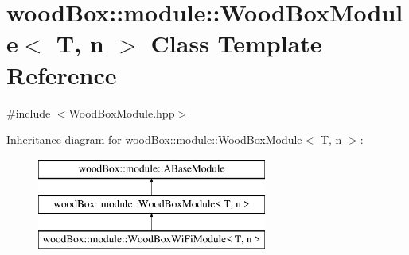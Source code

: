 \hypertarget{classwood_box_1_1module_1_1_wood_box_module}{}\section{wood\+Box\+:\+:module\+:\+:Wood\+Box\+Module$<$ T, n $>$ Class Template Reference}
\label{classwood_box_1_1module_1_1_wood_box_module}


{\ttfamily \#include $<$Wood\+Box\+Module.\+hpp$>$}

Inheritance diagram for wood\+Box\+:\+:module\+:\+:Wood\+Box\+Module$<$ T, n $>$\+:\begin{figure}[H]
\begin{center}
\leavevmode
\includegraphics[height=3.000000cm]{classwood_box_1_1module_1_1_wood_box_module}
\end{center}
\end{figure}
